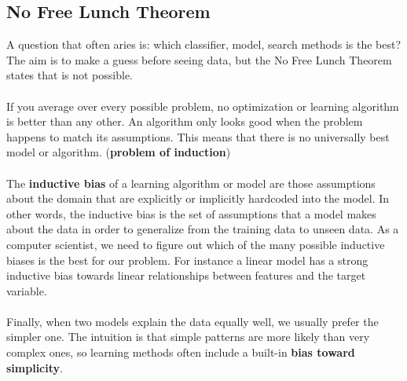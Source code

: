 \subsection{No Free Lunch Theorem}
A question that often aries is: which classifier, model, search methods is the best?
The aim is to make a guess before seeing data, but the No Free Lunch Theorem states that is not possible.
\\\\
If you average over every possible problem, no optimization or learning algorithm is better than any other.
An algorithm only looks good when the problem happens to match its assumptions.
This means that there is no universally best model or algorithm. (\textbf{problem of induction})
\\\\
The \textbf{inductive bias} of a learning algorithm or model are those assumptions about the domain that are explicitly or implicitly hardcoded into the model.
In other words, the inductive bias is the set of assumptions that a model makes about the data in order to generalize from the training data to unseen data.
As a computer scientist, we need to figure out which of the many possible inductive biases is the best for our problem.
For instance a linear model has a strong inductive bias towards linear relationships between features and the target variable.
\\\\
Finally, when two models explain the data equally well, we usually prefer the simpler one.
The intuition is that simple patterns are more likely than very complex ones, so learning methods often include a built-in \textbf{bias toward simplicity}.
